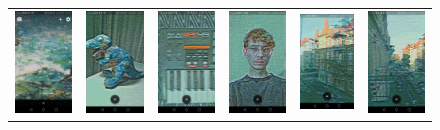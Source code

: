 \documentclass[../Main.tex]{subfiles}
\begin{document}
\begin{figure}[H]
\begin{tabular}{cccccc}
\includegraphics[width = 0.13\linewidth]{Images/app_photos/filters/ocean.jpg} &
\includegraphics[width = 0.13\linewidth]{Images/app_photos/dino/ocean.jpg} &
\includegraphics[width = 0.13\linewidth]{Images/app_photos/akai/ocean.jpg} &
\includegraphics[width = 0.13\linewidth]{Images/app_photos/me/ocean.jpg} &
\includegraphics[width = 0.13\linewidth]{Images/app_photos/kamienica/ocean.jpg} &
\includegraphics[width = 0.13\linewidth]{Images/app_photos/ulica/ocean.jpg} \\


\end{tabular}
\end{figure}
\end{document}
